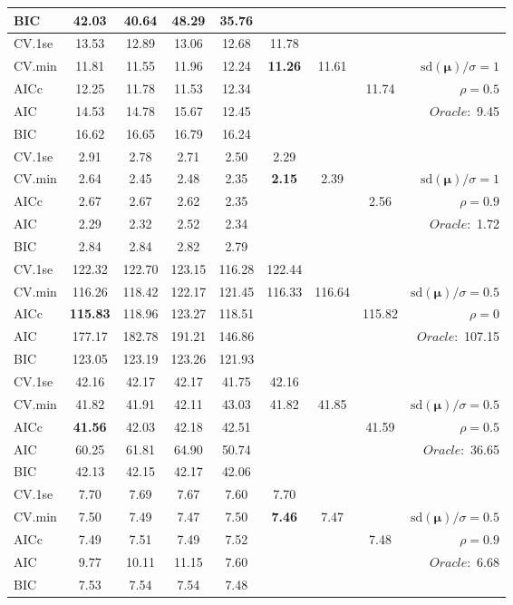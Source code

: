 \begin{table}
\begin{center}
\begin{tabular}{l*{7}{c}|r}
BIC & 42.03 & 40.64 & 48.29 & 35.76 & & & &  \\
 \hline 
CV.1se & 13.53 & 12.89 & 13.06 & 12.68 & 11.78 & & & \\
CV.min & 11.81 & 11.55 & 11.96 & 12.24 & {\bf 11.26} & 11.61 & & $\mathrm{sd}(\mathbf{\mu})/\sigma=1$ \\
AICc & 12.25 & 11.78 & 11.53 & 12.34 & & & 11.74 &  $\rho=0.5$ \\
AIC & 14.53 & 14.78 & 15.67 & 12.45 & & & &  \multirow{2}{*}{$Oracle: $ 9.45} \\
BIC & 16.62 & 16.65 & 16.79 & 16.24 & & & &  \\
 \hline 
CV.1se & 2.91 & 2.78 & 2.71 & 2.50 & 2.29 & & & \\
CV.min & 2.64 & 2.45 & 2.48 & 2.35 & {\bf 2.15} & 2.39 & & $\mathrm{sd}(\mathbf{\mu})/\sigma=1$ \\
AICc & 2.67 & 2.67 & 2.62 & 2.35 & & & 2.56 &  $\rho=0.9$ \\
AIC & 2.29 & 2.32 & 2.52 & 2.34 & & & &  \multirow{2}{*}{$Oracle: $ 1.72} \\
BIC & 2.84 & 2.84 & 2.82 & 2.79 & & & &  \\
 \hline 
CV.1se & 122.32 & 122.70 & 123.15 & 116.28 & 122.44 & & & \\
CV.min & 116.26 & 118.42 & 122.17 & 121.45 & 116.33 & 116.64 & & $\mathrm{sd}(\mathbf{\mu})/\sigma=0.5$ \\
AICc & {\bf 115.83} & 118.96 & 123.27 & 118.51 & & & 115.82 &  $\rho=0$ \\
AIC & 177.17 & 182.78 & 191.21 & 146.86 & & & &  \multirow{2}{*}{$Oracle: $ 107.15} \\
BIC & 123.05 & 123.19 & 123.26 & 121.93 & & & &  \\
 \hline 
CV.1se & 42.16 & 42.17 & 42.17 & 41.75 & 42.16 & & & \\
CV.min & 41.82 & 41.91 & 42.11 & 43.03 & 41.82 & 41.85 & & $\mathrm{sd}(\mathbf{\mu})/\sigma=0.5$ \\
AICc & {\bf 41.56} & 42.03 & 42.18 & 42.51 & & & 41.59 &  $\rho=0.5$ \\
AIC & 60.25 & 61.81 & 64.90 & 50.74 & & & &  \multirow{2}{*}{$Oracle: $ 36.65} \\
BIC & 42.13 & 42.15 & 42.17 & 42.06 & & & &  \\
 \hline 
CV.1se & 7.70 & 7.69 & 7.67 & 7.60 & 7.70 & & & \\
CV.min & 7.50 & 7.49 & 7.47 & 7.50 & {\bf 7.46} & 7.47 & & $\mathrm{sd}(\mathbf{\mu})/\sigma=0.5$ \\
AICc & 7.49 & 7.51 & 7.49 & 7.52 & & & 7.48 &  $\rho=0.9$ \\
AIC & 9.77 & 10.11 & 11.15 & 7.60 & & & &  \multirow{2}{*}{$Oracle: $ 6.68} \\
BIC & 7.53 & 7.54 & 7.54 & 7.48 & & & &  \\
 \hline 
\end{tabular}
\end{center}
\vspace{-1cm}
\end{table}





